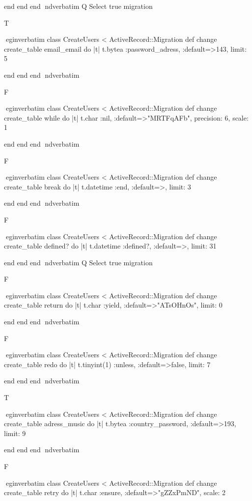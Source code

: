     end 
  end 
end
nd{verbatim}
Q
 Select true migration

T

egin{verbatim}
 class CreateUsers < ActiveRecord::Migration 
  def change 
    create_table email_email do |t| 
      t.bytea :password_adress, :default=>143, limit: 5
    
    end 
  end 
end
nd{verbatim}

F

egin{verbatim}
 class CreateUsers < ActiveRecord::Migration 
  def change 
    create_table while do |t| 
      t.char :nil, :default=>"MRTFqAFb", precision: 6, scale: 1
    
    end 
  end 
end
nd{verbatim}

F

egin{verbatim}
 class CreateUsers < ActiveRecord::Migration 
  def change 
    create_table break do |t| 
      t.datetime :end, :default=>, limit: 3
    
    end 
  end 
end
nd{verbatim}

F

egin{verbatim}
 class CreateUsers < ActiveRecord::Migration 
  def change 
    create_table defined? do |t| 
      t.datetime :defined?, :default=>, limit: 31
    
    end 
  end 
end
nd{verbatim}
Q
 Select true migration

F

egin{verbatim}
 class CreateUsers < ActiveRecord::Migration 
  def change 
    create_table return do |t| 
      t.char :yield, :default=>"ATsOHnOs", limit: 0
    
    end 
  end 
end
nd{verbatim}

F

egin{verbatim}
 class CreateUsers < ActiveRecord::Migration 
  def change 
    create_table redo do |t| 
      t.tinyint(1) :unless, :default=>false, limit: 7
    
    end 
  end 
end
nd{verbatim}

T

egin{verbatim}
 class CreateUsers < ActiveRecord::Migration 
  def change 
    create_table adress_music do |t| 
      t.bytea :country_password, :default=>193, limit: 9
    
    end 
  end 
end
nd{verbatim}

F

egin{verbatim}
 class CreateUsers < ActiveRecord::Migration 
  def change 
    create_table retry do |t| 
      t.char :ensure, :default=>"gZZxPmND", scale: 2
    
